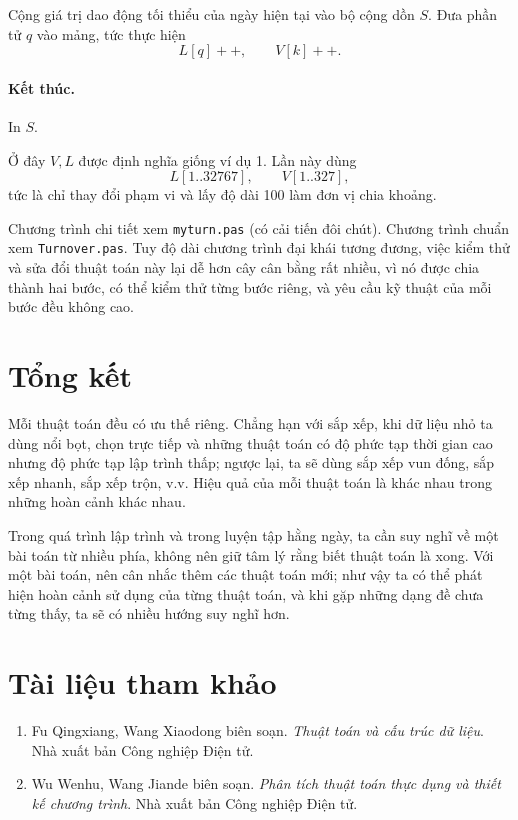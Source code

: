 \documentclass[11pt]{article}
\begin{document}
Cộng giá trị dao động tối thiểu của ngày hiện tại vào bộ cộng dồn \(S\). Đưa
phần tử \(q\) vào mảng, tức thực hiện
\[
  L[q]++,\qquad V[k]++.
\]

\paragraph{Kết thúc.}
In \(S\).

Ở đây \(V,L\) được định nghĩa giống ví dụ 1. Lần này dùng
\[
  L[1..32767],\qquad V[1..327],
\]
tức là chỉ thay đổi phạm vi và lấy độ dài 100 làm đơn vị chia khoảng.

Chương trình chi tiết xem \texttt{myturn.pas} (có cải tiến đôi chút). Chương
trình chuẩn xem \texttt{Turnover.pas}. Tuy độ dài chương trình đại khái tương
đương, việc kiểm thử và sửa đổi thuật toán này lại dễ hơn cây cân bằng rất
nhiều, vì nó được chia thành hai bước, có thể kiểm thử từng bước riêng, và yêu
cầu kỹ thuật của mỗi bước đều không cao.

\section{Tổng kết}

Mỗi thuật toán đều có ưu thế riêng. Chẳng hạn với sắp xếp, khi dữ liệu nhỏ ta
dùng nổi bọt, chọn trực tiếp và những thuật toán có độ phức tạp thời gian cao
nhưng độ phức tạp lập trình thấp; ngược lại, ta sẽ dùng sắp xếp vun đống, sắp
xếp nhanh, sắp xếp trộn, v.v. Hiệu quả của mỗi thuật toán là khác nhau trong
những hoàn cảnh khác nhau.

Trong quá trình lập trình và trong luyện tập hằng ngày, ta cần suy nghĩ về một
bài toán từ nhiều phía, không nên giữ tâm lý rằng biết thuật toán là xong. Với
một bài toán, nên cân nhắc thêm các thuật toán mới; như vậy ta có thể phát
hiện hoàn cảnh sử dụng của từng thuật toán, và khi gặp những dạng đề chưa từng
thấy, ta sẽ có nhiều hướng suy nghĩ hơn.

\section*{Tài liệu tham khảo}

\begin{enumerate}
  \item Fu Qingxiang, Wang Xiaodong biên soạn. \emph{Thuật toán và cấu trúc
        dữ liệu}. Nhà xuất bản Công nghiệp Điện tử.
  \item Wu Wenhu, Wang Jiande biên soạn. \emph{Phân tích thuật toán thực dụng
        và thiết kế chương trình}. Nhà xuất bản Công nghiệp Điện tử.
\end{enumerate}
\end{document}
